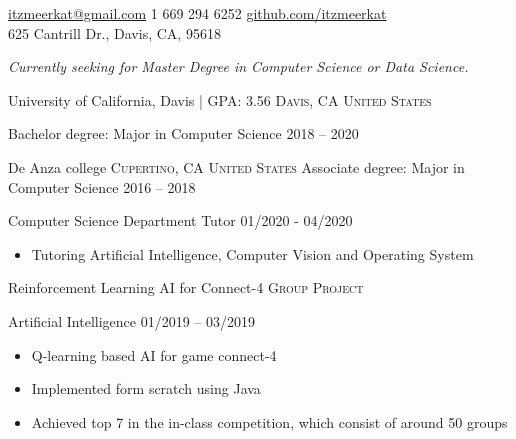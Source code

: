 \documentclass[10pt,a4paper]{article}
\begin{document}
\sloppy
{}

\nobreakvspace{0.3em}
\sbull
\noindent\href{mailto:itzmeerkat@gmail.com}
{itzmeerkat\mbox{}@\mbox{}gmail.com}
\sbull
\textsmaller{+}1 669 294 6252
\sbull
\href{https://github.com/itzmeerkat}{github.com/itzmeerkat}\\625 Cantrill Dr., Davis, CA, 95618
\spacedhrule{0.9em}{-0.4em}


\noindent \emph{Currently seeking for Master Degree in Computer Science or Data Science.}

\spacedhrule{0.9em}{-0.4em}

\headedsection
{University of California, Davis | GPA: 3.56}
{\textsc{Davis, CA United States}} {
  
  \headedsubsection
  {Bachelor degree: Major in Computer Science}
  {2018 -- 2020}
  {
  }
}

\headedsection
{De Anza college}
{\textsc{Cupertino, CA United States}} {
  \headedsubsection
  {Associate degree: Major in Computer Science}
  {2016 -- 2018}
  {
  }
}
\spacedhrule{0.9em}{-0.4em}


\headedsection
{Computer Science Department Tutor}
{01/2020 - 04/2020} {


{\begin{itemize}
	\item Tutoring Artificial Intelligence, Computer Vision and Operating System
\end{itemize}}
}
\vspace{0.5em}
\headedsection
  {Reinforcement Learning AI for Connect-4}
  {\textsc{Group Project}} {
  \headedsubsection
    {Artificial Intelligence}
    {01/2019 – 03/2019}
    {
      \begin{itemize}
      \item Q-learning based AI for game connect-4
      \item Implemented form scratch using Java
      \item Achieved top 7 in the in-class competition, which consist of around 50 groups
      \end{itemize}
    }
}
\vspace{0.5em}
\end{document}
